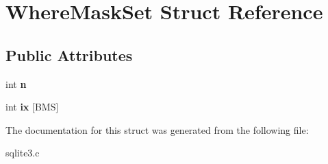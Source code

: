 \hypertarget{structWhereMaskSet}{}\section{Where\+Mask\+Set Struct Reference}
\label{structWhereMaskSet}
\subsection*{Public Attributes}
\begin{DoxyCompactItemize}
\item 
int {\bfseries n}\hypertarget{structWhereMaskSet_a09923e1dee2157c78c5ae0df65e8ee7c}{}\label{structWhereMaskSet_a09923e1dee2157c78c5ae0df65e8ee7c}

\item 
int {\bfseries ix} \mbox{[}B\+MS\mbox{]}\hypertarget{structWhereMaskSet_a9de4e7b27d4f793f37c1ead7b44ecb48}{}\label{structWhereMaskSet_a9de4e7b27d4f793f37c1ead7b44ecb48}

\end{DoxyCompactItemize}


The documentation for this struct was generated from the following file\+:\begin{DoxyCompactItemize}
\item 
sqlite3.\+c\end{DoxyCompactItemize}
